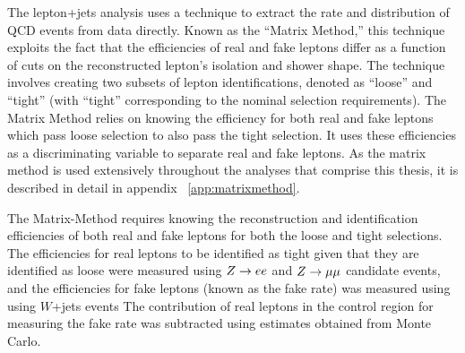 The lepton+jets analysis uses a technique to extract the rate and distribution of QCD events from data directly.
Known as the ``Matrix Method,'' this technique exploits the fact that the efficiencies of real and fake leptons differ as a function of cuts on the reconstructed lepton's isolation and shower shape.
The technique involves creating two subsets of lepton identifications, denoted as ``loose'' and ``tight'' (with ``tight'' corresponding to the nominal selection requirements).
The Matrix Method relies on knowing the efficiency for both real and fake leptons which pass loose selection to also pass the tight selection.
It uses these efficiencies as a discriminating variable to separate real and fake leptons.
As the matrix method is used extensively throughout the analyses that comprise this thesis, it is described in detail in appendix ~\ref{app:matrixmethod}.

The Matrix-Method requires knowing the reconstruction and identification efficiencies of both
real and fake leptons for both the loose and tight selections.
The efficiencies for real leptons to be identified as tight given that they are identified as loose
were measured using $Z \rightarrow ee$ and $Z \rightarrow \mu\mu$ candidate events, and the efficiencies for fake leptons
(known as the fake rate) was measured using using $W$+jets events
The contribution of real leptons in the control region for measuring the fake rate was 
subtracted using estimates obtained from Monte Carlo.


